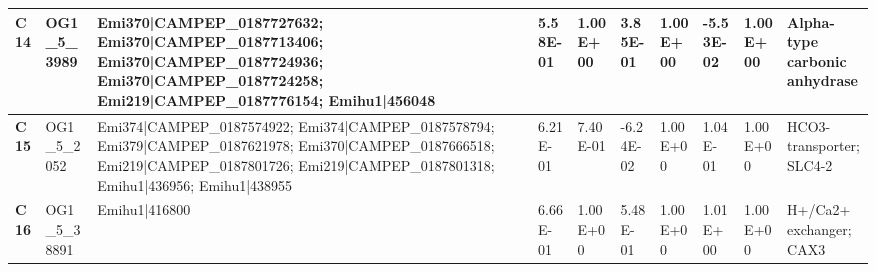 \begin{landscape}
\begin{center}
\begin{footnotesize}
\begin{longtable}{|p{0.5cm}|p{1.5cm}|p{4cm}|l|l|l|l|l|l|l|}
\textbf{C14} & OG1\_5\_3989  & Emi370|CAMPEP\_0187727632; Emi370|CAMPEP\_0187713406; Emi370|CAMPEP\_0187724936; Emi370|CAMPEP\_0187724258; Emi219|CAMPEP\_0187776154; Emihu1|456048                                                                                                                                                                                                                                                                                                                                                                                                                                                                                     & 5.58E-01  & 1.00E+00 & 3.85E-01  & 1.00E+00 & -5.53E-02 & 1.00E+00 & Alpha-type carbonic anhydrase                                                \\ \hline
\textbf{C15} & OG1\_5\_2052  & Emi374|CAMPEP\_0187574922; Emi374|CAMPEP\_0187578794; Emi379|CAMPEP\_0187621978; Emi370|CAMPEP\_0187666518; Emi219|CAMPEP\_0187801726; Emi219|CAMPEP\_0187801318; Emihu1|436956; Emihu1|438955                                                                                                                                                                                                                                                                                                                                                                                                                                           & 6.21E-01  & 7.40E-01 & -6.24E-02 & 1.00E+00 & 1.04E-01  & 1.00E+00 & HCO3- transporter; SLC4-2                                                    \\ \hline
\textbf{C16} & OG1\_5\_38891 & Emihu1|416800                                                                                                                                                                                                                                                                                                                                                                                                                                                                                                                                                                                                                            & 6.66E-01  & 1.00E+00 & 5.48E-01  & 1.00E+00 & 1.01E+00  & 1.00E+00 & H+/Ca2+ exchanger; CAX3                                                      \\ \hline

\end{longtable}
\end{footnotesize}
\end{center}
\end{landscape}
